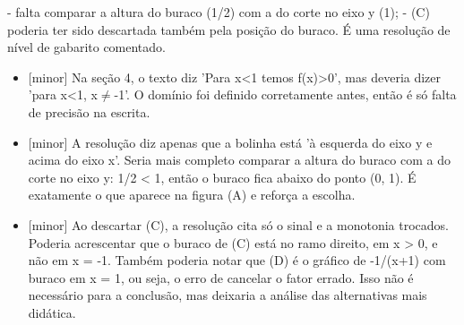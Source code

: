\documentclass{article}%
\begin{document}
{-} falta comparar a altura do buraco (1/2) com a do corte no eixo y (1);\newline%
{-} (C) poderia ter sido descartada também pela posição do buraco.\newline%
\newline%
É uma resolução de nível de gabarito comentado.%
\begin{itemize}%
\item%
{[}minor{]} Na seção 4, o texto diz 'Para x<1 temos f(x)>0', mas deveria dizer 'para x<1, x$\neq$-1'. O domínio foi definido corretamente antes, então é só falta de precisão na escrita.%
\item%
{[}minor{]} A resolução diz apenas que a bolinha está 'à esquerda do eixo y e acima do eixo x'. Seria mais completo comparar a altura do buraco com a do corte no eixo y: 1/2 < 1, então o buraco fica abaixo do ponto (0, 1). É exatamente o que aparece na figura (A) e reforça a escolha.%
\item%
{[}minor{]} Ao descartar (C), a resolução cita só o sinal e a monotonia trocados. Poderia acrescentar que o buraco de (C) está no ramo direito, em x > 0, e não em x = -1. Também poderia notar que (D) é o gráfico de -1/(x+1) com buraco em x = 1, ou seja, o erro de cancelar o fator errado. Isso não é necessário para a conclusão, mas deixaria a análise das alternativas mais didática.%
\end{itemize}%
\end{document}
